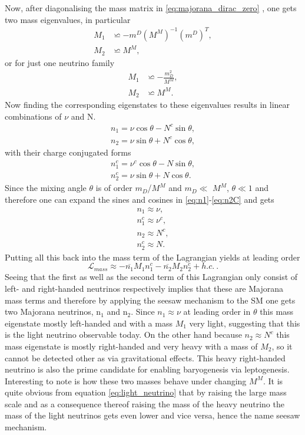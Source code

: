 Now, after diagonalising the mass matrix in \eqref{eq:majorana_dirac_zero} \cite[pp. 2-3]{Lindner:2001hr}, one gets two mass eigenvalues, in particular
\begin{align*}
	M_1&\backsimeq-m^D{\left(M^M\right)}^{-1}{\left(m^D\right)}^{T},\\
	M_2&\backsimeq M^M,
\end{align*}
or for just one neutrino family
\begin{align}
	M_1&\backsimeq -\frac{m_D^2}{M^M},
	\label{eq:light_neutrino}
	\\
	M_2&\backsimeq M^M.
	\label{eq:heavy_neutrino}
\end{align}
Now finding the corresponding eigenstates to these eigenvalues results in linear combinations of $\nu$ and N.
\begin{align}
	n_{1}=\nu\cos\theta-N^c\sin\theta,
	\label{eq:n1}
	\\
	n_{2}=\nu\sin\theta+N^c\cos\theta,
	\label{eq:n2}
\end{align}
with their charge conjugated forms
\begin{align}
n_{1}^c=\nu^c\cos\theta-N\sin\theta,
\label{eq:n1C}
\\
n_{2}^c=\nu\sin\theta+N\cos\theta.
\label{eq:n2C}
\end{align}
Since the mixing angle $\theta$ is of order $m_D$/$M^M$ and $m_D\ll$ $M^M$, $\theta\ll1$ and therefore one can expand the sines and cosines in \eqref{eq:n1}-\eqref{eq:n2C} and gets
\begin{align}
	n_{1}\approx\nu,\\
	n_{1}^c\approx\nu^c,\\
	n_{2}\approx N^c,\\
	n_{2}^c\approx N.
\end{align}
Putting all this back into the mass term of the Lagrangian yields at leading order
\begin{equation}
	\mathcal{L}_{mass}\approx-\overline{n_1}M_1n_1^c-\overline{n_2}M_2n_2^c+h.c.\:.
\end{equation}
Seeing that the first as well as the second term of this Lagrangian only consist of left- and right-handed neutrinos respectively implies that these are Majorana mass terms and therefore by applying the seesaw mechanism to the SM one gets two Majorana neutrinos, n$_1$ and n$_2$. \newline\indent
Since $n_{1}\approx\nu$ at leading order in $\theta$ this mass eigenstate mostly left-handed and with a mass $M_1$ very light, suggesting that this is the light neutrino observable today.\newline\indent
On the other hand because $n_{2}\approx N^c$ this mass eigenstate is mostly right-handed and very heavy with a mass of $M_2$, so it cannot be detected other as via gravitational effects. This heavy right-handed neutrino is also the prime candidate for enabling baryogenesis via leptogenesis. \newline\indent
Interesting to note is how these two masses behave under changing $M^M$. It is quite obvious from equation \eqref{eq:light_neutrino} that by raising the large mass scale and as a consequence thereof raising the mass of the heavy neutrino the mass of the light neutrinos gets even lower and vice versa, hence the name seesaw mechanism. 
